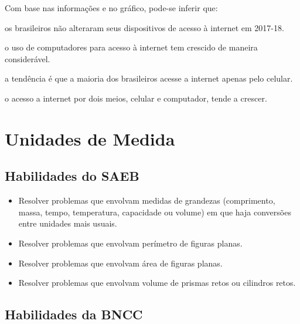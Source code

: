 
Com base nas informações e no gráfico, pode-se inferir que:

\begin{escolha}

  \item os brasileiros não alteraram seus dispositivos de acesso à internet em 2017-18.

  \item o uso de computadores para acesso à internet tem crescido de maneira considerável.

  \item a tendência é que a maioria dos brasileiros acesse a internet apenas pelo celular.

  \item o acesso a internet por dois meios, celular e computador, tende a crescer.

\end{escolha}


\chapter{Unidades de Medida}

\section*{Habilidades do SAEB}

\begin{itemize}

  \item Resolver problemas que envolvam medidas de grandezas (comprimento,
massa, tempo, temperatura, capacidade ou volume) em que haja
conversões entre unidades mais usuais. 
  \item Resolver problemas que envolvam perímetro de figuras planas. 
  \item Resolver problemas que envolvam área de figuras planas. 
  \item Resolver problemas que envolvam volume de prismas retos ou cilindros
retos.  

\end{itemize} 

\section*{Habilidades da BNCC}

